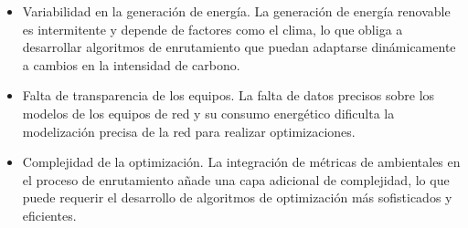 \begin{itemize}
    \item Variabilidad en la generación de energía. La generación de energía renovable es intermitente y depende de factores como el clima, lo que obliga a desarrollar algoritmos de enrutamiento que puedan adaptarse dinámicamente a cambios en la intensidad de carbono.
    \item Falta de transparencia de los equipos. La falta de datos precisos sobre los modelos de los equipos de red y su consumo energético dificulta la modelización precisa de la red para realizar optimizaciones.
    \item Complejidad de la optimización. La integración de métricas de ambientales en el proceso de enrutamiento añade una capa adicional de complejidad, lo que puede requerir el desarrollo de algoritmos de optimización más sofisticados y eficientes.
\end{itemize}